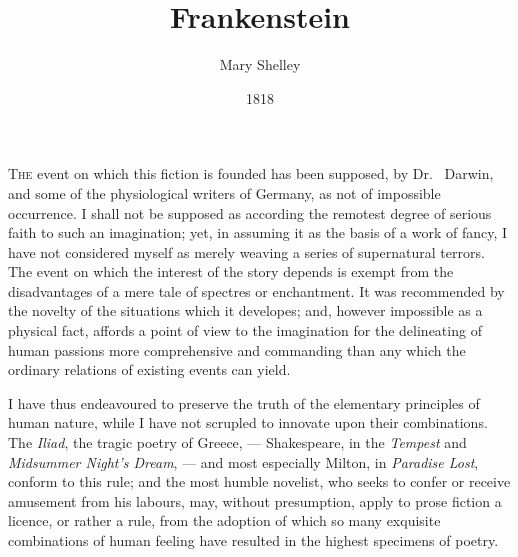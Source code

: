 
\newcommand{\frDate}[1]{
\vspace{1em minus 1em}
{\small\raggedleft #1

}
\vspace{1em minus 0.5em}}

\newcommand{\frLetterSig}[1]{
\vspace{0em plus 4em}
\begin{flushright}
\vbox{#1}
\end{flushright}}

\frontmatter
\title{Frankenstein}
\author{Mary Shelley}
\date{1818}


\maketitle
\tableofcontents




\textsc{The} event on which this fiction is
founded has been supposed, by Dr.~%
Darwin, and some of the physiological
writers of Germany, as not
of impossible occurrence. I shall
not be supposed as according the
remotest degree of serious faith to
such an imagination; yet, in assuming
it as the basis of a work of
fancy, I have not considered myself
as merely weaving a series of supernatural
terrors. The event on
which the interest of the story depends
is exempt from the disadvantages
of a mere tale of spectres
or enchantment. It was recommended
by the novelty of the situations
which it developes; and,
however impossible as a physical
fact, affords a point of view to the
imagination for the delineating of
human passions more comprehensive
and commanding than any
which the ordinary relations of existing
events can yield.

I have thus endeavoured to preserve
the truth of the elementary
principles of human nature, while I
have not scrupled to innovate upon
their combinations. The \emph{Iliad}, the
tragic poetry of Greece, --- Shakespeare,
in the \emph{Tempest} and \emph{Midsummer
Night's Dream}, --- and most
especially Milton, in \emph{Paradise Lost},
conform to this rule; and the most
humble novelist, who seeks to confer
or receive amusement from his labours,
may, without presumption,
apply to prose fiction a licence, or
rather a rule, from the adoption of
which so many exquisite combinations
of human feeling have resulted
in the highest specimens of
poetry.

